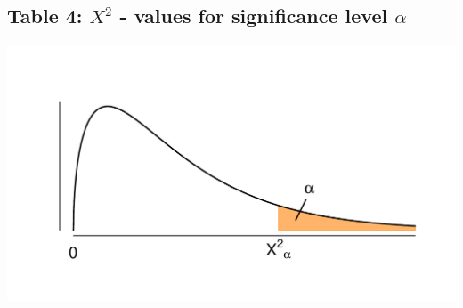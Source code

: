 \subsection{Table 4: $X^2$ - values for significance level $\alpha$}
\label{table4}

\vspace*{-30pt}
\begin{minipage}{0.6\textwidth}
\hfill
\end{minipage}
\begin{minipage}{0.4\textwidth}
\includegraphics[width=\textwidth]{Files/Images/chisquare.pdf}
\end{minipage}

